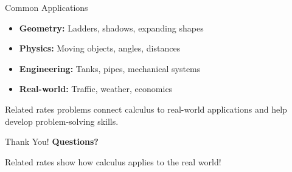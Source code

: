 \documentclass[aspectratio=169]{beamer}
\begin{document}
\begin{frame}{Common Applications}
\begin{itemize}
    \item \textbf{Geometry:} Ladders, shadows, expanding shapes
    \item \textbf{Physics:} Moving objects, angles, distances
    \item \textbf{Engineering:} Tanks, pipes, mechanical systems
    \item \textbf{Real-world:} Traffic, weather, economics
\end{itemize}

\vspace{0.5cm}
Related rates problems connect calculus to real-world applications and help develop problem-solving skills.
\end{frame}

\begin{frame}{Thank You!}
\centering
\vspace{2cm}
{\Huge \textcolor{myblue}{\textbf{Questions?}}}

\vspace{1cm}
{\Large Related rates show how calculus applies to the real world!}
\end{frame}
\end{document}
